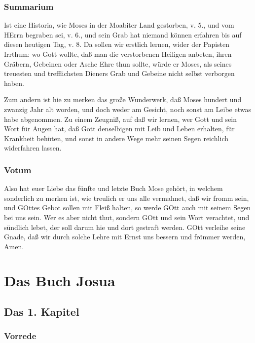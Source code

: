 \section{Summarium}

Ist eine Historia, wie Moses in der Moabiter Land gestorben, v. 5., und vom HErrn begraben sei, v. 6., und sein Grab hat niemand können erfahren bis auf diesen heutigen Tag, v. 8. Da sollen wir erstlich lernen, wider der Papisten Irrthum: wo Gott wollte, daß man die verstorbenen Heiligen anbeten, ihren Gräbern, Gebeinen oder Asche Ehre thun sollte, würde er Moses, als seines treuesten und trefflichsten Dieners Grab und Gebeine nicht selbst verborgen haben.

Zum andern ist hie zu merken das große Wunderwerk, daß Moses hundert und zwanzig Jahr alt worden, und doch weder am Gesicht, noch sonst am Leibe etwas habe abgenommen. Zu einem Zeugniß, auf daß wir lernen, wer Gott und sein Wort für Augen hat, daß Gott denselbigen mit Leib und Leben erhalten, für Krankheit behüten, und sonst in andere Wege mehr seinen Segen reichlich widerfahren lassen.

\section{Votum}

Also hat euer Liebe das fünfte und letzte Buch Mose gehört, in welchem sonderlich zu merken ist, wie treulich er uns alle vermahnet, daß wir fromm sein, und GOttes Gebot sollen mit Fleiß halten, so werde GOtt auch mit seinem Segen bei uns sein. Wer es aber nicht thut, sondern GOtt und sein Wort verachtet, und sündlich lebet, der soll darum hie und dort gestraft werden. GOtt verleihe seine Gnade, daß wir durch solche Lehre mit Ernst uns bessern und frömmer werden, Amen.

\part{Das Buch Josua}

\chapter{Das 1. Kapitel}

\section{Vorrede}

